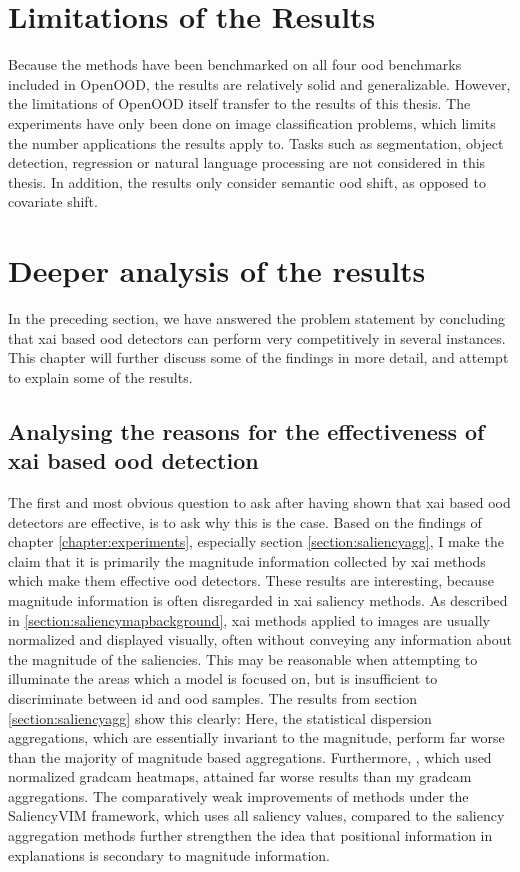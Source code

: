 \documentclass[UKenglish]{uiomasterthesis} %
\theoremstyle{definition}
\begin{document}
\section{Limitations of the Results}

Because the methods have been benchmarked on all four \ac{ood} benchmarks included in OpenOOD, the results are relatively solid and generalizable. However, the limitations of OpenOOD itself transfer to the results of this thesis. The experiments have only been done on image classification problems, which limits the number applications the results apply to. Tasks such as segmentation, object detection, regression or natural language processing are not considered in this thesis. In addition, the results only consider semantic \ac{ood} shift, as opposed to covariate shift.

\section{Deeper analysis of the results}

In the preceding section, we have answered the problem statement by concluding that \ac{xai} based \ac{ood} detectors can perform very competitively in several instances. This chapter will further discuss some of the findings in more detail, and attempt to explain some of the results.

\subsection{Analysing the reasons for the effectiveness of \ac{xai} based \ac{ood} detection}

The first and most obvious question to ask after having shown that \ac{xai} based \ac{ood} detectors are effective, is to ask why this is the case. Based on the findings of chapter \ref{chapter:experiments}, especially section \ref{section:saliencyagg}, I make the claim that it is primarily the magnitude information collected by \ac{xai} methods which make them effective \ac{ood} detectors. These results are interesting, because magnitude information is often disregarded in \ac{xai} saliency methods. As described in \ref{section:saliencymapbackground}, \ac{xai} methods applied to images are usually normalized and displayed visually, often without conveying any information about the magnitude of the saliencies. This may be reasonable when attempting to illuminate the areas which a model is focused on, but is insufficient to discriminate between \ac{id} and \ac{ood} samples. The results from section \ref{section:saliencyagg} show this clearly: Here, the statistical dispersion aggregations, which are essentially invariant to the magnitude, perform far worse than the majority of magnitude based aggregations. Furthermore, \cite{martinez}, which used normalized \ac{gradcam} heatmaps, attained far worse results than my \ac{gradcam} aggregations. The comparatively weak improvements of methods under the SaliencyVIM framework, which uses all saliency values, compared to the saliency aggregation methods further strengthen the idea that positional information in explanations is secondary to magnitude information.
\end{document}
